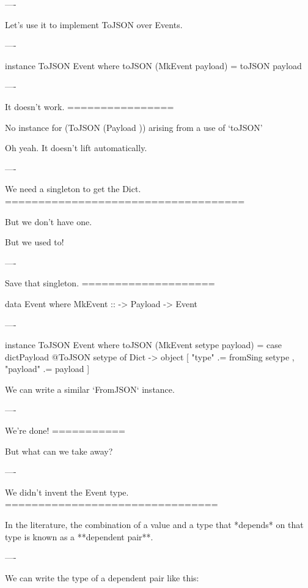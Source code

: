 ----

Let's use it to implement ToJSON over Events.

----

\begin{hs}
  instance ToJSON Event where
    toJSON (MkEvent payload) = toJSON payload
\end{hs}

----

It doesn't work.
================

\begin{error}
  No instance for (ToJSON (Payload ))
    arising from a use of `toJSON'
\end{error}

Oh yeah. It doesn't lift automatically.

----

We need a singleton to get the Dict.
====================================

But we don't have one.

But we used to!

----

Save that singleton.
====================

\begin{raw}
  data Event where
    MkEvent :: 
            -> Payload 
            -> Event
\end{raw}

----

\begin{hs}
  instance ToJSON Event where
    toJSON (MkEvent setype payload) =
      case dictPayload @ToJSON setype of
        Dict ->
          object [ "type"    .= fromSing setype
                 , "payload" .= payload
                 ]
\end{hs}

We can write a similar `FromJSON` instance.

----

We're done!
===========

But what can we take away?

----

We didn't invent the Event type.
================================

In the literature, the combination of a value and a type that *depends* on that type is known as a **dependent pair**.

----

We can write the type of a dependent pair like this:


